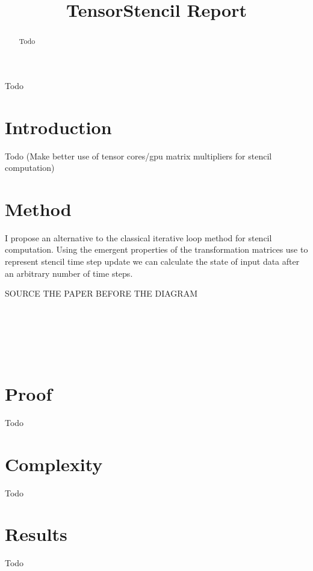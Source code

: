 \documentclass[conference]{IEEEtran}
\begin{document}
\title{TensorStencil Report}

\author{

}

\maketitle

\begin{abstract}
Todo
\end{abstract}

\begin{IEEEkeywords}
Todo
\end{IEEEkeywords}


\section{Introduction}
Todo (Make better use of tensor cores/gpu matrix multipliers for stencil computation)
\section{Method}
I propose an alternative to the classical iterative loop method for stencil computation. 
Using the emergent properties of the transformation matrices use to represent stencil time step update we can calculate the state of input data after an arbitrary number of time steps. 

SOURCE THE PAPER BEFORE THE DIAGRAM \\

 \\
 \\
 \\
 \\
 \\

\section{Proof}

Todo
\section{Complexity}
Todo
\section{Results}
Todo
\end{document}
